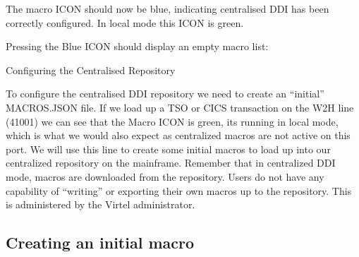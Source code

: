 \documentclass[letterpaper,10pt,english]{sphinxmanual}
\begin{document}
The macro ICON should now be blue, indicating centralised DDI has been correctly configured. In local mode this ICON is green.



Pressing the Blue ICON should display an empty macro list:



\ignorespaces 
Configuring the Centralised Repository

To configure the centralised DDI repository we need to create an “initial” MACROS.JSON file. If we load up a TSO or CICS transaction on the W2H line (41001) we can see that the Macro ICON is green, its running in local mode, which is what we would also expect as centralized macros are not active on this port. We will use this line to create some initial macros to load up into our centralized repository on the mainframe. Remember that in centralized DDI mode, macros are downloaded from the repository. Users do not have any capability of “writing” or exporting their own macros up to the repository. This is administered by the Virtel administrator.

\begin{sphinxVerbatim}[commandchars=\\\{\}]
\end{sphinxVerbatim}



\ignorespaces 

\subsection{Creating an initial macro}
\label{\detokenize{Customization:creating-an-initial-macro}}\label{\detokenize{Customization:index-91}}
\end{document}
